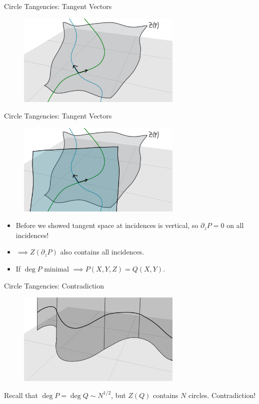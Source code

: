 \documentclass{beamer}
\newcommand{\nfr}[1]{\begin{frame} #1
\end{frame}}
\begin{document}
\nfr{{Circle Tangencies: Tangent Vectors}
\begin{figure}[h]
    \centering
    \includegraphics[width=0.7\textwidth]{images/lots_of_dots_h.png}
\end{figure}

}
\nfr{{Circle Tangencies: Tangent Vectors}
\begin{figure}[h]
    \centering
    \includegraphics[width=0.7\textwidth]{images/lots_of_dots_i.png}
\end{figure}
\begin{itemize}
    \item Before we showed tangent space at incidences is vertical, so $\partial_z P = 0$ on all incidences! \pause
    \item $\implies Z(\partial_z P)$ also contains all incidences. \pause
    \item If $\deg P$ minimal $\implies P(X,Y,Z) = Q(X,Y)$.
\end{itemize}
}
\nfr{{Circle Tangencies: Contradiction}
\begin{figure}[h]
    \centering
    \includegraphics[width=0.7\textwidth]{images/lots_of_dots_j.png}
\end{figure}
Recall that $\deg P = \deg Q \sim N^{1/2}$, but $Z(Q)$ contains $N$ circles.
Contradiction!
}
\end{document}
